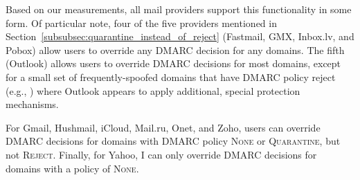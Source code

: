 Based on our measurements, all mail providers support this functionality in some form.
Of particular note, four of the five providers 
mentioned in Section~\ref{subsubsec:quarantine_instead_of_reject}
(Fastmail, GMX, Inbox.lv, and Pobox)
allow users to override any DMARC decision for any domains.
The fifth (Outlook) allows users to override DMARC decisions for most domains, except for a small set of frequently-spoofed domains that have DMARC policy reject (e.g., ) where Outlook appears to apply additional, special protection mechanisms.

For Gmail, Hushmail, iCloud, Mail.ru, Onet, and Zoho, users can override DMARC decisions for domains with DMARC policy \textsc{None} or \textsc{Quarantine}, but not \textsc{Reject}.  Finally, for Yahoo, I can only override DMARC decisions for domains with a policy of \textsc{None}.










